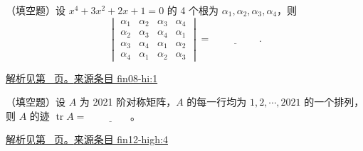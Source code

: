 \documentclass[UTF8,12pt,a4paper,fontset=fandol]{ctexart}
\begin{document}
\begin{example}\label{ex:fin08-hi:1}

（填空题）设 $x^{4}+3x^{2}+2x+1=0$ 的 4 个根为 $\alpha_{1},\alpha_{2},\alpha_{3},\alpha_{4}$，则
\[
\begin{vmatrix}
\alpha_{1} & \alpha_{2} & \alpha_{3} & \alpha_{4} \\
\alpha_{2} & \alpha_{3} & \alpha_{4} & \alpha_{1} \\
\alpha_{3} & \alpha_{4} & \alpha_{1} & \alpha_{2} \\
\alpha_{4} & \alpha_{1} & \alpha_{2} & \alpha_{3}
\end{vmatrix}=\underline{\hspace{2cm}}.
\]

\par\hyperref[ans:fin08-hi:1]{解析见第~\pageref{ans:fin08-hi:1} 页。}\quad\href{https://github.com/lzxcr/cmc-mathematics/blob/64916fa1fdbc3e444a652eca204d5669058ee321/src/problems/finals/08/01.md}{来源条目 fin08-hi:1}

\end{example}

\begin{example}\label{ex:fin12-high:4}

（填空题）设 $A$ 为 2021 阶对称矩阵，$A$ 的每一行均为 $1,2,\cdots,2021$ 的一个排列，则 $A$ 的迹 $\operatorname{tr} A=$ $\underline{\qquad\qquad}$。

\par\hyperref[ans:fin12-high:4]{解析见第~\pageref{ans:fin12-high:4} 页。}\quad\href{https://github.com/lzxcr/cmc-mathematics/blob/64916fa1fdbc3e444a652eca204d5669058ee321/src/problems/finals/12/04.md}{来源条目 fin12-high:4}

\end{example}
\end{document}
